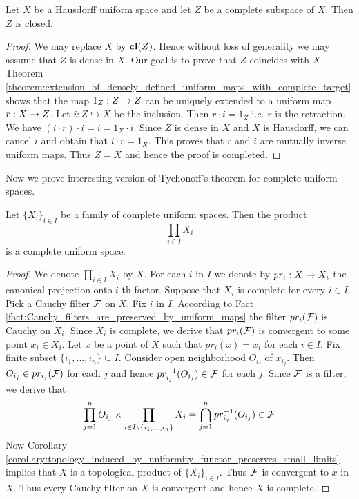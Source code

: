 \begin{theorem}\label{theorem:complete_in_Hausdorff_is_closed}
	Let $X$ be a Hausdorff uniform space and let $Z$ be a complete subspace of $X$. Then $Z$ is closed.
\end{theorem}
\begin{proof}
	We may replace $X$ by $\mathbf{cl}(Z)$. Hence without loss of generality we may assume that $Z$ is dense in $X$. Our goal is to prove that $Z$ coincides with $X$. Theorem \ref{theorem:extension_of_densely_defined_uniform_maps_with_complete_target} shows that the map $1_Z:Z\rightarrow Z$ can be uniquely extended to a uniform map $r:X \rightarrow Z$. Let $i:Z \hookrightarrow X$ be the inclusion. Then $r\cdot i = 1_Z$ i.e. $r$ is the retraction. We have $\left(i\cdot r\right)\cdot i = i = 1_X\cdot i$. Since $Z$ is dense in $X$ and $X$ is Hausdorff, we can cancel $i$ and obtain that $i\cdot r = 1_X$. This proves that $r$ and $i$ are mutually inverse uniform maps. Thus $Z = X$ and hence the proof is completed.
\end{proof}
\noindent
Now we prove interesting version of Tychonoff's theorem for complete uniform spaces.

\begin{theorem}\label{theorem:product_of_complete_spaces_is_complete}
	Let $\{X_i\}_{i \in I}$ be a family of complete uniform spaces. Then the product
	$$\prod_{i \in I}X_i$$
	is a complete uniform space.
\end{theorem}
\begin{proof}
	We denote $\prod_{i \in I}X_i$ by $X$. For each $i$ in $I$ we denote by $pr_i:X\rightarrow X_i$ the canonical projection onto $i$-th factor. Suppose that $X_i$ is complete for every $i \in I$. Pick a Cauchy filter ${\mathcal F}$ on $X$. Fix $i$ in $I$. According to Fact \ref{fact:Cauchy_filters_are_preserved_by_uniform_maps} the filter $pr_i({\mathcal F})$ is Cauchy on $X_i$. Since $X_i$ is complete, we derive that $pr_i({\mathcal F})$ is convergent to some point $x_i \in X_i$. Let $x$ be a point of $X$ such that $pr_i(x) = x_i$ for each $i \in I$. Fix finite subset $\{i_1,...,i_n\}\subseteq I$. Consider open neighborhood $O_{i_j}$ of $x_{i_j}$. Then $O_{i_j}\in pr_{i_j}({\mathcal F})$ for each $j$ and hence $pr_{i_j}^{-1}(O_{i_j}) \in {\mathcal F}$ for each $j$. Since ${\mathcal F}$ is a filter, we derive that
	$$\prod_{j=1}^nO_{i_j}\times \prod_{i\in I \setminus \{i_1,...,i_n\}}X_i = \bigcap_{j=1}^n pr^{-1}_{i_j}(O_{i_j}) \in {\mathcal F}$$
	Now Corollary \ref{corollary:topology_induced_by_uniformity_functor_preserves_small_limits} implies that $X$ is a topological product of $\{X_i\}_{i\in I}$. Thus ${\mathcal F}$ is convergent to $x$ in $X$. Thus every Cauchy filter on $X$ is convergent and hence $X$ is complete.
\end{proof}


